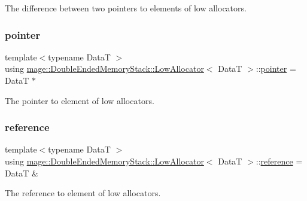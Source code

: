 The difference between two pointers to elements of low allocators. \hypertarget{structmage_1_1_double_ended_memory_stack_1_1_low_allocator_a1b1b80faf9e5a34f5ee35979a78f68a7}{}\label{structmage_1_1_double_ended_memory_stack_1_1_low_allocator_a1b1b80faf9e5a34f5ee35979a78f68a7} 
\subsubsection{\texorpdfstring{pointer}{pointer}}
{\footnotesize\ttfamily template$<$typename DataT $>$ \\
using \hyperlink{structmage_1_1_double_ended_memory_stack_1_1_low_allocator}{mage\+::\+Double\+Ended\+Memory\+Stack\+::\+Low\+Allocator}$<$ DataT $>$\+::\hyperlink{structmage_1_1_double_ended_memory_stack_1_1_low_allocator_a1b1b80faf9e5a34f5ee35979a78f68a7}{pointer} =  DataT $\ast$}

The pointer to element of low allocators. \hypertarget{structmage_1_1_double_ended_memory_stack_1_1_low_allocator_a0d6e290bc4fa4cc0d8595a8eadf21508}{}\label{structmage_1_1_double_ended_memory_stack_1_1_low_allocator_a0d6e290bc4fa4cc0d8595a8eadf21508} 
\subsubsection{\texorpdfstring{reference}{reference}}
{\footnotesize\ttfamily template$<$typename DataT $>$ \\
using \hyperlink{structmage_1_1_double_ended_memory_stack_1_1_low_allocator}{mage\+::\+Double\+Ended\+Memory\+Stack\+::\+Low\+Allocator}$<$ DataT $>$\+::\hyperlink{structmage_1_1_double_ended_memory_stack_1_1_low_allocator_a0d6e290bc4fa4cc0d8595a8eadf21508}{reference} =  DataT \&}

The reference to element of low allocators. \hypertarget{structmage_1_1_double_ended_memory_stack_1_1_low_allocator_ad59f0cf4da8f47289493179d9236e342}{}\label{structmage_1_1_double_ended_memory_stack_1_1_low_allocator_ad59f0cf4da8f47289493179d9236e342} 
